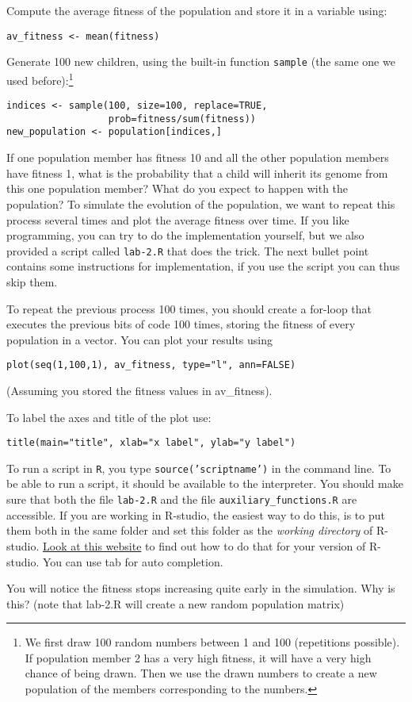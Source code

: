 \documentclass[a4paper, 9pt]{article}
\begin{document}
\begin{exercise}
    \action Compute the average fitness of the population and store it in a variable using:
\begin{lstlisting}
av_fitness <- mean(fitness)
\end{lstlisting}
    \action Generate 100 new children, using the built-in function \texttt{sample} (the same one we used before):\footnote{We first draw 100 random numbers between 1 and 100 (repetitions possible). If population member 2 has a very high fitness, it will have a very high chance of being drawn. Then we use the drawn numbers to create a new population of the members corresponding to the numbers.}
\begin{lstlisting}
indices <- sample(100, size=100, replace=TRUE, 
                  prob=fitness/sum(fitness))
new_population <- population[indices,]
\end{lstlisting}
    \ask If one population member has fitness 10 and all the other population members have fitness 1, what is the probability that a child will inherit its genome from this one population member? What do you expect to happen with the population?
    \action To simulate the evolution of the population, we want to repeat this process several times and plot the average fitness over time. If you like programming, you can try to do the implementation yourself, but we also provided a script called \texttt{lab-2.R} that does the trick. The next bullet point contains some instructions for implementation, if you use the script you can thus skip them.

    \action To repeat the previous process 100 times, you should create a for-loop that executes the previous bits of code 100 times, storing the fitness of every population in a vector. You can plot your results using
\begin{lstlisting}
plot(seq(1,100,1), av_fitness, type="l", ann=FALSE)
\end{lstlisting}
    (Assuming you stored the fitness values in av\_fitness).
    \item[] To label the axes and title of the plot use:
\begin{lstlisting}
title(main="title", xlab="x label", ylab="y label")
\end{lstlisting}

    \action To run a script in \texttt{R}, you type \texttt{source('scriptname')} in the command line. To be able to run a script, it should be available to the interpreter. You should make sure that both the file \texttt{lab-2.R} and the file \texttt{auxiliary\_functions.R} are accessible. If you are working in R-studio, the easiest way to do this, is to put them both in the same folder and set this folder as the \textit{working directory} of R-studio. \href{https://support.rstudio.com/hc/en-us/articles/200711843-Working-Directories-and-Workspaces}{Look at this website} to find out how to do that for your version of R-studio. You can use tab for auto completion.

    \askstar You will notice the fitness stops increasing quite early in the simulation. Why is this? (note that lab-2.R will create a new random population matrix)
\end{exercise}
\end{document}
